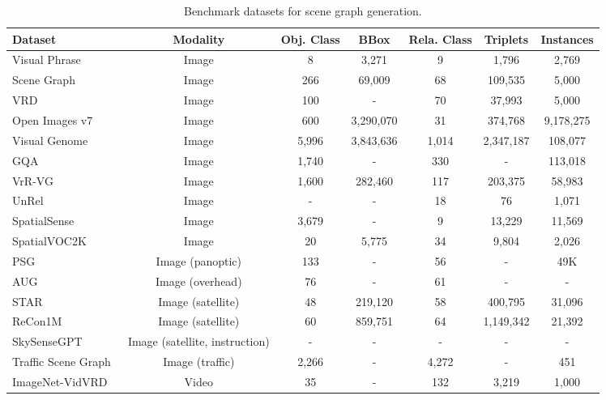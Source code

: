 \begin{table}[!t]
  \centering
\caption{Benchmark datasets for scene graph generation.}
\label{tab:SGG_data}
\fontsize{8}{10}\selectfont
\setlength{\tabcolsep}{2.5mm}
  \begin{tabular}{lcccccc}
    \toprule
    \textbf{Dataset} & \textbf{Modality} &\textbf{ Obj. Class} & \textbf{BBox} & \textbf{Rela. Class} & \textbf{Triplets} & \textbf{Instances} \\
    \midrule
    Visual Phrase~\cite{Sadeghi2011VisualPhrases} & Image & 8 & 3,271 & 9 & 1,796 & 2,769 \\
    Scene Graph~\cite{johnson2015image} & Image & 266 & 69,009 & 68 & 109,535 & 5,000 \\
    VRD~\cite{lu2016visual} & Image & 100 & - & 70 & 37,993 & 5,000 \\
    Open Images v7~\cite{kuznetsova2020open} & Image & 600 & 3,290,070 & 31 & 374,768 & 9,178,275 \\
    Visual Genome~\cite{krishna2017visual} & Image & 5,996 & 3,843,636 & 1,014 & 2,347,187 & 108,077 \\
    GQA~\cite{hudson2019gqa} & Image & 1,740 & - & 330 & - & 113,018 \\
    VrR-VG~\cite{liang2019vrr} & Image & 1,600 & 282,460 & 117 & 203,375 & 58,983 \\
    UnRel~\cite{peyre2017weakly} & Image & - & - & 18 & 76 & 1,071 \\
    SpatialSense~\cite{yang2019spatialsense} & Image & 3,679 & - & 9 & 13,229 & 11,569 \\
    SpatialVOC2K~\cite{belz2018spatialvoc2k} & Image & 20 & 5,775 & 34 & 9,804 & 2,026 \\
    PSG~\cite{yang2022panoptic} & Image (panoptic) & 133 & - & 56 & - & 49K \\
    AUG~\cite{li2024aug} & Image (overhead) & 76 & - & 61 & - & - \\
    STAR~\cite{li2025star} & Image (satellite) & 48 & 219,120 & 58 & 400,795 & 31,096 \\
    ReCon1M~\cite{yan2025recon1m} & Image (satellite) & 60 & 859,751 & 64 & 1,149,342 & 21,392 \\
    SkySenseGPT~\cite{luo2024skysensegpt} & Image (satellite, instruction) & - & - & - & - & - \\
    Traffic Scene Graph~\cite{zhou2022toward} & Image (traffic) & 2,266 & - & 4,272 & - & 451 \\
    ImageNet-VidVRD~\cite{shang2017video} & Video & 35 & - & 132 & 3,219 & 1,000 \\

\end{tabular}
\end{table}
